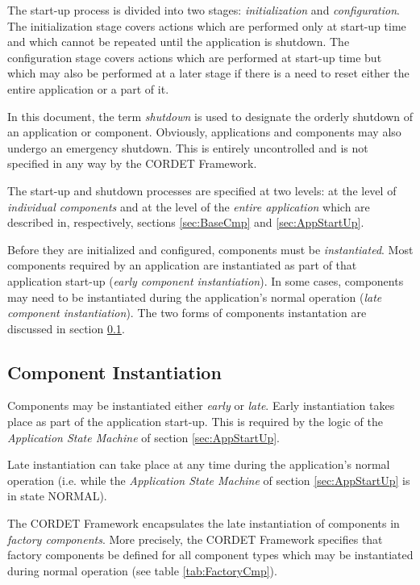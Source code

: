 \documentclass[a4paper,10pt]{article}
\begin{document}
The start-up process is divided into two stages: \textit{initialization} and \textit{configuration}. The initialization stage covers actions which are performed only at start-up time and which cannot be repeated until the application is shutdown. The configuration stage covers actions which are performed at start-up time but which may also be performed at a later stage if there is a need to reset either the entire application or a part of it. 

In this document, the term \textit{shutdown} is used to designate the orderly shutdown of an application or component. Obviously, applications and components may also undergo an emergency shutdown. This is entirely uncontrolled and is not specified in any way by the CORDET Framework.

The start-up and shutdown processes are specified at two levels: at the level of \textit{individual components} and at the level of the \textit{entire application} which are described in, respectively, sections \ref{sec:BaseCmp} and \ref{sec:AppStartUp}.

Before they are initialized and configured, components must be \textit{instantiated}. Most components required by an application are instantiated as part of that application start-up (\textit{early component instantiation}). In some cases, components may need to be instantiated during the application's normal operation (\textit{late component instantiation}). The two forms of components instantation are discussed in section \ref{sec:CmpInst}.

\subsection{Component Instantiation}\label{sec:CmpInst}

Components may be instantiated either \textit{early} or \textit{late}. Early instantiation takes place as part of the application start-up. This is required by the logic of the \textit{Application State Machine} of section \ref{sec:AppStartUp}.

Late instantiation can take place at any time during the application's normal operation (i.e. while the \textit{Application State Machine} of section \ref{sec:AppStartUp} is in state NORMAL). 

The CORDET Framework encapsulates the late instantiation of components in \textit{factory components}. More precisely, the CORDET Framework specifies that factory components be defined for all component types which may be instantiated during normal operation (see table \ref{tab:FactoryCmp}).
\end{document}
